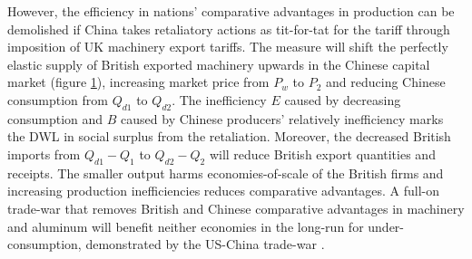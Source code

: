 \documentclass[a4paper,12pt]{article}
\newcommand{\tikzfig}[1]{}
\begin{document}
\begin{figure}[H]
    \centering
    \tikzfig{assets/re.txt}
    \caption{}
    \label{fig:forex}
\end{figure}

However, the efficiency in nations' comparative advantages in production can be demolished if China takes retaliatory actions as tit-for-tat for the tariff through imposition of UK machinery export tariffs. The measure will shift the perfectly elastic supply of British exported machinery upwards in the Chinese capital market (figure \ref{fig:forex}), increasing market price from $P_w$ to $P_2$ and reducing Chinese consumption from $Q_{d1}$ to $Q_{d2}$. The inefficiency $E$ caused by decreasing consumption and $B$ caused by Chinese producers' relatively inefficiency marks the DWL in social surplus from the retaliation. Moreover, the decreased British imports from $Q_{d1}-Q_1$ to $Q_{d2}-Q_2$ will reduce British export quantities and receipts. The smaller output harms economies-of-scale of the British firms and increasing production inefficiencies reduces comparative advantages. A full-on trade-war that removes British and Chinese comparative advantages in machinery and aluminum will benefit neither economies in the long-run for under-consumption, demonstrated by the US-China trade-war \parencite{hass_denmark_2022}.
\end{document}
